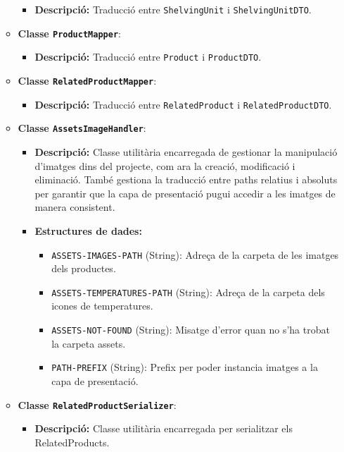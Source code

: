 \documentclass[a4paper,12pt]{report}
\begin{document}
\begin{itemize}
\begin{itemize}
		\begin{itemize}
			\item \textbf{Descripció:} Traducció entre \texttt{ShelvingUnit} i \texttt{ShelvingUnitDTO}.
		\end{itemize}
\item \textbf{Classe \texttt{ProductMapper}}:
		\begin{itemize}
			\item \textbf{Descripció:} Traducció entre \texttt{Product} i \texttt{ProductDTO}.
		\end{itemize}
\item \textbf{Classe \texttt{RelatedProductMapper}}:
		\begin{itemize}
			\item \textbf{Descripció:} Traducció entre \texttt{RelatedProduct} i \texttt{RelatedProductDTO}.
		\end{itemize}
\item \textbf{Classe \texttt{AssetsImageHandler}}:
		\begin{itemize}
			\item \textbf{Descripció:} Classe utilitària encarregada de gestionar la manipulació d'imatges dins del projecte, com ara la creació, modificació i eliminació. També gestiona la traducció entre paths relatius i absoluts per garantir que la capa de presentació pugui accedir a les imatges de manera consistent.
			\item \textbf{Estructures de dades:}
			\begin{itemize}
			\item \texttt{ASSETS-IMAGES-PATH} (String): Adreça de la carpeta de les imatges dels productes.
			\item \texttt{ASSETS-TEMPERATURES-PATH} (String): Adreça de la carpeta dels icones de temperatures.
			\item \texttt{ASSETS-NOT-FOUND} (String): Misatge d'error quan no s'ha trobat la carpeta assets.
			\item \texttt{PATH-PREFIX} (String): Prefix per poder instancia imatges a la capa de presentació.
			\end{itemize}
		\end{itemize}
\item \textbf{Classe \texttt{RelatedProductSerializer}}:
		\begin{itemize}
			\item \textbf{Descripció:} Classe utilitària encarregada per serialitzar els RelatedProducts.
		\end{itemize}
\end{itemize}


\end{itemize}
\end{document}
